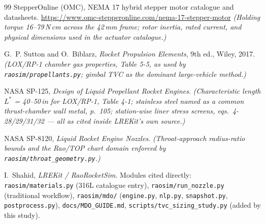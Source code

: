 \documentclass[11pt]{article}
\newcommand{\cmd}[1]{\nolinkurl{#1}}
\begin{document}
\begin{thebibliography}{99}
 StepperOnline (OMC),
NEMA 17 hybrid stepper motor catalogue and datasheets.
\url{https://www.omc-stepperonline.com/nema-17-stepper-motor}
\emph{(Holding torque 16--79\,N\,cm across the 42\,mm frame; rotor inertia,
rated current, and physical dimensions used in the actuator catalogue.)}

 G.~P. Sutton and O.~Biblarz,
\emph{Rocket Propulsion Elements}, 9th ed., Wiley, 2017.
\emph{(LOX/RP-1 chamber gas properties, Table 5-5, as used by
\cmd{raosim/propellants.py}; gimbal TVC as the dominant large-vehicle
method.)}

 NASA SP-125,
\emph{Design of Liquid Propellant Rocket Engines}.
\emph{(Characteristic length $L^*$ = 40--50\,in for LOX/RP-1, Table 4-1;
stainless steel named as a common thrust-chamber wall metal, p.~105;
station-wise liner stress screens, eqs.~4-28/29/31/32 --- all as cited
inside LREKit's own source.)}

 NASA SP-8120,
\emph{Liquid Rocket Engine Nozzles}.
\emph{(Throat-approach radius-ratio bounds and the Rao/TOP chart domain
enforced by \cmd{raosim/throat\_geometry.py}.)}

 I.~Shahid, \emph{LREKit / RaoRocketSim}.
Modules cited directly: \cmd{raosim/materials.py} (316L catalogue entry),
\cmd{raosim/run\_nozzle.py} (traditional workflow),
\cmd{raosim/mdo/} (\cmd{engine.py}, \cmd{nlp.py}, \cmd{snapshot.py},
\cmd{postprocess.py}), \cmd{docs/MDO\_GUIDE.md},
\cmd{scripts/tvc\_sizing\_study.py} (added by this study).

\end{thebibliography}
\end{document}
